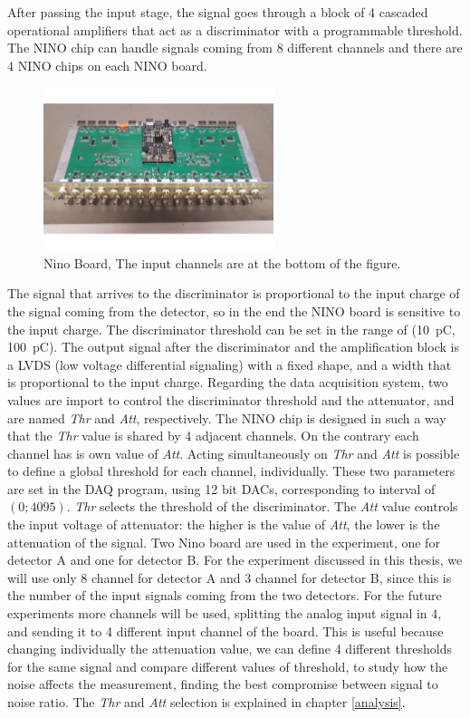 After passing the input stage, the signal goes through a block of 4 cascaded operational amplifiers that act as a discriminator with a programmable threshold. The NINO chip can handle signals coming from $8$ different channels and there are 4 NINO chips on each NINO board. 

\begin{figure}[!ht]
\centering
\includegraphics[width = 0.6\textwidth]{ExperimentalSetup/NINO.pdf}
\caption{Nino Board, The input channels are at the bottom of the figure.}
\label{fig:NinoBoard}
\end{figure}

The signal that arrives to the discriminator is proportional to the input charge of the signal coming from the detector, so in the end the NINO board is sensitive to the input charge. The discriminator threshold can be set in the range of (\SI{10}{\pico \coulomb}, \SI{100}{\pico \coulomb}). 
The output signal after the discriminator and the amplification block is a LVDS (low voltage differential signaling) with a fixed shape, and a width that is proportional to the input charge. Regarding the data acquisition system, two values are import to control the discriminator threshold and the attenuator, and are named \textit{Thr} and \textit{Att}, respectively. The NINO chip is designed in such a way that the \textit{Thr} value is shared by 4 adjacent channels. On the contrary each channel has is own value of \textit{Att}. Acting simultaneously on \textit{Thr} and \textit{Att} is possible to define a global threshold for each channel, individually.
These two parameters are set in the DAQ program, using 12 bit DACs, corresponding to interval of $(0 ; 4095)$. \textit{Thr} selects the threshold of the discriminator. The \textit{Att} value controls the input voltage of attenuator: the higher is the value of \textit{Att}, the lower is the attenuation of the signal.
Two Nino board are used in the experiment, one for detector A and one for detector B. For the experiment discussed in this thesis, we will use only 8 channel for detector A and 3 channel for detector B, since this is the number of the input signals coming from the two detectors. For the future experiments more channels will be used, splitting the analog input signal in 4, and sending it to 4 different input channel of the board. This is useful because changing individually the attenuation value, we can define 4 different thresholds for the same signal and compare different values of threshold, to study how the noise affects the measurement, finding the best compromise between signal to noise ratio. The \textit{Thr} and \textit{Att} selection is explained in chapter \ref{analysis}.



